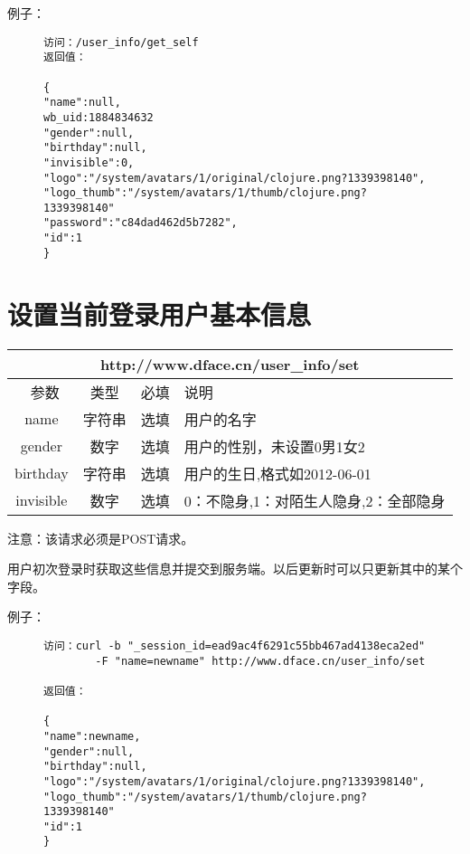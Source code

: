\documentclass[cs4size]{ctexartutf8}
\begin{document}
例子：

\begin{figure}[H]
\begin{verbatim}
访问：/user_info/get_self
返回值：

{
"name":null,
wb_uid:1884834632
"gender":null,
"birthday":null,
"invisible":0,
"logo":"/system/avatars/1/original/clojure.png?1339398140",
"logo_thumb":"/system/avatars/1/thumb/clojure.png?1339398140"
"password":"c84dad462d5b7282",
"id":1
}

\end{verbatim}
\end{figure}



\section{设置当前登录用户基本信息}

\begin{table}[H]
   \begin{center}
\begin{tabular}{|c|c|c|p{12cm}|}
\hline
\multicolumn{4}{|c|}{http://www.dface.cn/user\_info/set} \\
\hline\hline
 \  参数  & 类型 & 必填 &  说明  \\
\hline
 name  & 字符串 & 选填 &  用户的名字\\
\hline
 gender  & 数字 & 选填 &  用户的性别，未设置0男1女2\\
\hline
 birthday  & 字符串 & 选填 &  用户的生日,格式如2012-06-01\\
 \hline
 invisible  & 数字 & 选填 &  0：不隐身,1：对陌生人隐身,2：全部隐身\\
\hline
\end{tabular}
   \end{center}
\end{table}

注意：该请求必须是POST请求。

用户初次登录时获取这些信息并提交到服务端。以后更新时可以只更新其中的某个字段。

例子：

\begin{figure}[H]
\begin{verbatim}
访问：curl -b "_session_id=ead9ac4f6291c55bb467ad4138eca2ed" 
        -F "name=newname" http://www.dface.cn/user_info/set

返回值：

{
"name":newname,
"gender":null,
"birthday":null,
"logo":"/system/avatars/1/original/clojure.png?1339398140",
"logo_thumb":"/system/avatars/1/thumb/clojure.png?1339398140"
"id":1
}

\end{verbatim}
\end{figure}
\end{document}
